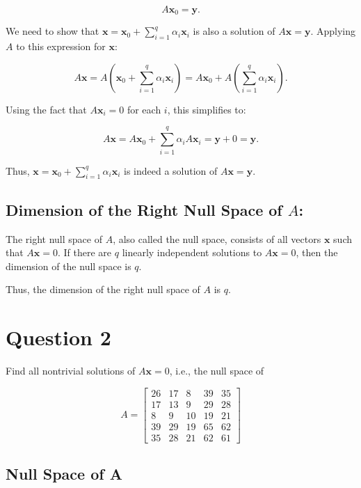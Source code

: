 \documentclass{article}
\begin{document}
\[
A \mathbf{x}_0 = \mathbf{y}.
\]

We need to show that \( \mathbf{x} = \mathbf{x}_0 + \sum_{i=1}^{q} \alpha_i \mathbf{x}_i \) is also a solution of \( A \mathbf{x} = \mathbf{y} \). Applying \( A \) to this expression for \( \mathbf{x} \):

\[
A \mathbf{x} = A \left( \mathbf{x}_0 + \sum_{i=1}^{q} \alpha_i \mathbf{x}_i \right) = A \mathbf{x}_0 + A \left( \sum_{i=1}^{q} \alpha_i \mathbf{x}_i \right).
\]

Using the fact that \( A \mathbf{x}_i = 0 \) for each \( i \), this simplifies to:

\[
A \mathbf{x} = A \mathbf{x}_0 + \sum_{i=1}^{q} \alpha_i A \mathbf{x}_i = \mathbf{y} + 0 = \mathbf{y}.
\]

Thus, \( \mathbf{x} = \mathbf{x}_0 + \sum_{i=1}^{q} \alpha_i \mathbf{x}_i \) is indeed a solution of \( A \mathbf{x} = \mathbf{y} \).

\subsection{Dimension of the Right Null Space of \( A \):}

The right null space of \( A \), also called the null space, consists of all vectors \( \mathbf{x} \) such that \( A \mathbf{x} = 0 \). If there are \( q \) linearly independent solutions to \( A \mathbf{x} = 0 \), then the dimension of the null space is \( q \).

Thus, the dimension of the right null space of \( A \) is \( q \).

\section{Question 2}

Find all nontrivial solutions of \( A \mathbf{x} = 0 \), i.e., the null space of

\[
A = 
\begin{bmatrix}
26 & 17 & 8  & 39 & 35 \\
17 & 13 & 9  & 29 & 28 \\
8  & 9  & 10 & 19 & 21 \\
39 & 29 & 19 & 65 & 62 \\
35 & 28 & 21 & 62 & 61
\end{bmatrix}
\]

\subsection{Null Space of A}
\end{document}
